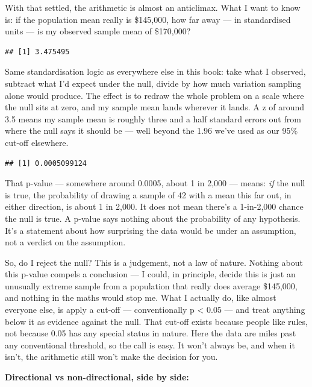 \documentclass[
]{book}
\begin{document}
With that settled, the arithmetic is almost an anticlimax. What I want to know is: if the population mean really is \$145,000, how far away --- in standardised units --- is my observed sample mean of \$170,000?

\begin{verbatim}
## [1] 3.475495
\end{verbatim}

Same standardisation logic as everywhere else in this book: take what I observed, subtract what I'd expect under the null, divide by how much variation sampling alone would produce. The effect is to redraw the whole problem on a scale where the null sits at zero, and my sample mean lands wherever it lands. A z of around 3.5 means my sample mean is roughly three and a half standard errors out from where the null says it should be --- well beyond the 1.96 we've used as our 95\% cut-off elsewhere.

\begin{verbatim}
## [1] 0.0005099124
\end{verbatim}

That p-value --- somewhere around 0.0005, about 1 in 2,000 --- means: \emph{if} the null is true, the probability of drawing a sample of 42 with a mean this far out, in either direction, is about 1 in 2,000. It does not mean there's a 1-in-2,000 chance the null is true. A p-value says nothing about the probability of any hypothesis. It's a statement about how surprising the data would be under an assumption, not a verdict on the assumption.

So, do I reject the null? This is a judgement, not a law of nature. Nothing about this p-value compels a conclusion --- I could, in principle, decide this is just an unusually extreme sample from a population that really does average \$145,000, and nothing in the maths would stop me. What I actually do, like almost everyone else, is apply a cut-off --- conventionally p \textless{} 0.05 --- and treat anything below it as evidence against the null. That cut-off exists because people like rules, not because 0.05 has any special status in nature. Here the data are miles past any conventional threshold, so the call is easy. It won't always be, and when it isn't, the arithmetic still won't make the decision for you.

\textbf{Directional vs non-directional, side by side:}
\end{document}
